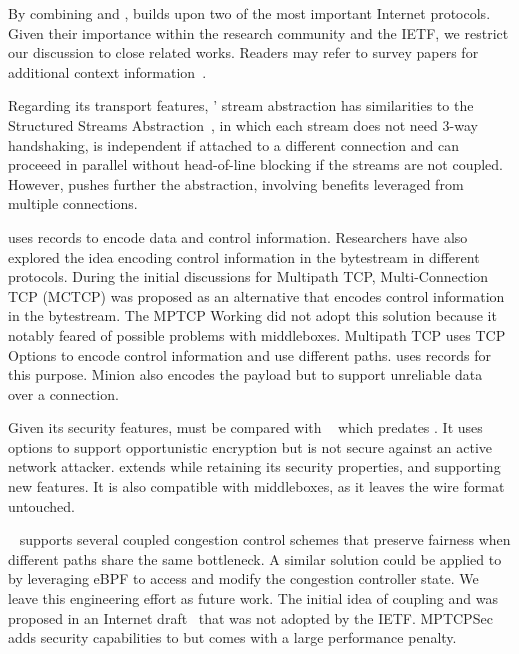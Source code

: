
By combining \tcp and \tls, \tcpls builds upon two of the most important
Internet protocols. Given their importance within 
the research community and the IETF, we restrict our discussion to close
related works. Readers may refer to survey papers for additional 
context 
information~\cite{polese2019survey,li2016multipath,papastergiou2016ossifying}.

Regarding its transport features, \tcpls' stream abstraction has similarities to
the Structured Streams Abstraction~\cite{ford2007structured}, in which each
stream does not need 3-way handshaking, is independent if attached to a
different \tcp connection and can proceeed in parallel without head-of-line
blocking if the streams are not coupled. However, \tcpls pushes further the
abstraction, involving benefits leveraged from multiple connections.

\tcpls uses \tls records to encode data and control information. Researchers
have also explored the idea encoding control information in the bytestream in
different protocols. During the initial discussions for Multipath TCP, 
Multi-Connection TCP (MCTCP) \cite{draft-scharf-mptcp-mctcp-01}
was proposed as an alternative that encodes control information in the bytestream.
The MPTCP Working did not adopt this solution because it notably feared of
possible problems with middleboxes. Multipath TCP \cite{raiciu2012hard,rfc6824}
uses TCP Options to encode control information and use different paths. \tcpls
uses \tls records for this purpose. Minion \cite{nowlan2012fitting} also
encodes the \tcp payload but to support unreliable data over a connection. 


Given its security features, \tcpls must be compared with 
\tcpcrypt~\cite{bittau2010case,rfc8548} which predates . It uses \tcp 
options to support opportunistic encryption but is not secure against an active 
network attacker. \tcpls extends \tls while retaining its security 
properties, and supporting new features. It is also compatible with \tcp 
middleboxes, as it leaves the \tcp wire format untouched.

\mptcp~\cite{raiciu2012hard,rfc6824} supports several coupled congestion 
control schemes
\cite{peng2014multipath,wischik2011design,khalili2013mptcp} that preserve
fairness when different paths share the same bottleneck. A similar solution 
could be applied to \tcpls by leveraging eBPF to access and modify the 
congestion controller state. We leave this engineering effort as future work.
The initial idea of coupling \mptcp and \tls was proposed in an
Internet draft~\cite{draft-paasch-mptcp-ssl-00} that was not adopted by the
IETF. MPTCPSec~\cite{jadin2017securing} adds security capabilities to \mptcp but
comes with a large performance penalty.

